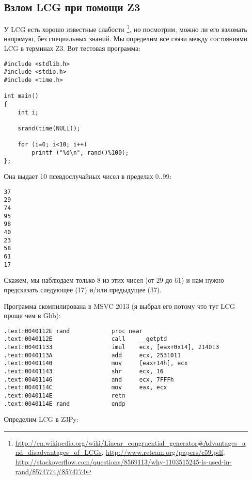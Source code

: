 \subsection{Взлом \ac{LCG} при помощи Z3}

У \ac{LCG} есть хорошо известные слабости
\footnote{\url{http://en.wikipedia.org/wiki/Linear_congruential_generator\#Advantages_and_disadvantages_of_LCGs},
\url{http://www.reteam.org/papers/e59.pdf},
\url{http://stackoverflow.com/questions/8569113/why-1103515245-is-used-in-rand/8574774\#8574774}},
но посмотрим, можно ли его взломать напрямую, без специальных знаний.
Мы определим все связи между состояниями LCG в терминах Z3.
Вот тестовая программа:

\begin{lstlisting}
#include <stdlib.h>
#include <stdio.h>
#include <time.h>

int main()
{
	int i;

	srand(time(NULL));

	for (i=0; i<10; i++)
		printf ("%d\n", rand()%100);
};
\end{lstlisting}

Она выдает 10 псевдослучайных чисел в пределах 0..99:

\begin{lstlisting}
37
29
74
95
98
40
23
58
61
17
\end{lstlisting}

Скажем, мы наблюдаем только 8 из этих чисел (от 29 до 61) и нам нужно предсказать следующее (17) и/или предыдущее (37).

Программа скомпилирована в MSVC 2013 (я выбрал его потому что тут LCG проще чем в Glib):

\begin{lstlisting}
.text:0040112E rand            proc near
.text:0040112E                 call    __getptd
.text:00401133                 imul    ecx, [eax+0x14], 214013
.text:0040113A                 add     ecx, 2531011
.text:00401140                 mov     [eax+14h], ecx
.text:00401143                 shr     ecx, 16
.text:00401146                 and     ecx, 7FFFh
.text:0040114C                 mov     eax, ecx
.text:0040114E                 retn
.text:0040114E rand            endp
\end{lstlisting}

Определим \ac{LCG} в Z3Py:

